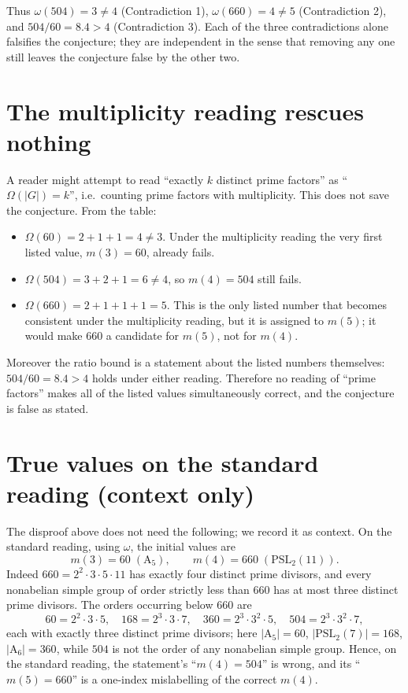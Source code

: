 \documentclass[11pt]{article}
\theoremstyle{definition}
\theoremstyle{remark}
\begin{document}
Thus $\omega(504) = 3 \ne 4$ (Contradiction 1), $\omega(660) = 4 \ne 5$
(Contradiction 2), and $504/60 = 8.4 > 4$ (Contradiction 3). Each of the three
contradictions alone falsifies the conjecture; they are independent in the sense that
removing any one still leaves the conjecture false by the other two.

\section{The multiplicity reading rescues nothing}

A reader might attempt to read ``exactly $k$ distinct prime factors'' as
``$\Omega(|G|) = k$'', i.e.\ counting prime factors with multiplicity. This does not
save the conjecture. From the table:

\begin{itemize}
\item $\Omega(60) = 2 + 1 + 1 = 4 \ne 3$. Under the multiplicity reading the very
first listed value, $m(3) = 60$, already fails.
\item $\Omega(504) = 3 + 2 + 1 = 6 \ne 4$, so $m(4) = 504$ still fails.
\item $\Omega(660) = 2 + 1 + 1 + 1 = 5$. This is the only listed number that becomes
consistent under the multiplicity reading, but it is assigned to $m(5)$; it would make
$660$ a candidate for $m(5)$, not for $m(4)$.
\end{itemize}

Moreover the ratio bound is a statement about the listed numbers themselves:
$504/60 = 8.4 > 4$ holds under either reading. Therefore no reading of ``prime
factors'' makes all of the listed values simultaneously correct, and the conjecture is
false as stated.

\section{True values on the standard reading (context only)}

The disproof above does not need the following; we record it as context. On the
standard reading, using $\omega$, the initial values are
\[
m(3) = 60 \;(\mathrm{A}_5), \qquad m(4) = 660 \;(\mathrm{PSL}_2(11)).
\]
Indeed $660 = 2^{2}\cdot 3\cdot 5\cdot 11$ has exactly four distinct prime divisors,
and every nonabelian simple group of order strictly less than $660$ has at most three
distinct prime divisors. The orders occurring below $660$ are
\[
60 = 2^{2}\cdot 3\cdot 5,\quad
168 = 2^{3}\cdot 3\cdot 7,\quad
360 = 2^{3}\cdot 3^{2}\cdot 5,\quad
504 = 2^{3}\cdot 3^{2}\cdot 7,
\]
each with exactly three distinct prime divisors; here
$|\mathrm{A}_5| = 60$, $|\mathrm{PSL}_2(7)| = 168$, $|\mathrm{A}_6| = 360$, while
$504$ is not the order of any nonabelian simple group. Hence, on the standard reading,
the statement's ``$m(4) = 504$'' is wrong, and its ``$m(5) = 660$'' is a one-index
mislabelling of the correct $m(4)$.
\end{document}
